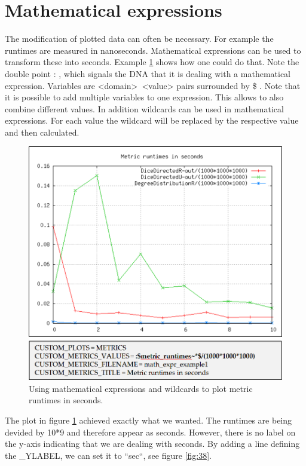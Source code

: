 \section{Mathematical expressions}
The modification of plotted data can often be necessary. For example the runtimes are measured in nanoseconds. Mathematical expressions can be used to transform these into seconds. Example \ref{fig:37} shows how one could do that. Note the double point : , which signals the DNA that it is dealing with a mathematical expression. Variables are <domain>~<value> pairs surrounded by \$ . Note that it is possible to add multiple variables to one expression. This allows to also combine different values. In addition wildcards can be used in mathematical expressions. For each value the wildcard will be replaced by the respective value and then calculated.

\begin{figure} [h]
\centering
\includegraphics [scale=0.5] {images/37}
\caption{Using mathematical expressions and wildcards to plot metric runtimes in seconds.}
\label{fig:37}
\end{figure}

The plot in figure \ref{fig:37} achieved exactly what we wanted. The runtimes are being devided by 10*9 and therefore appear as seconds. However, there is no label on the y-axis indicating that we are dealing with seconds. By adding a line defining the {\_}YLABEL, we can set it to “sec“, see figure \ref{fig:38}.

